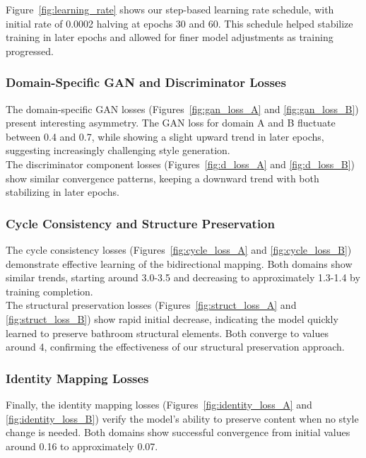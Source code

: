 \documentclass[twocolumn,superscriptaddress,aps]{revtex4-1}
\begin{document}
Figure~\ref{fig:learning_rate} shows our step-based learning rate schedule, with initial rate of 0.0002 halving at epochs 30 and 60. This schedule helped stabilize training in later epochs and allowed for finer model adjustments as training progressed.

\subsubsection{Domain-Specific GAN and Discriminator Losses}

The domain-specific GAN losses (Figures~\ref{fig:gan_loss_A} and \ref{fig:gan_loss_B}) present interesting asymmetry. The GAN loss for domain A and B fluctuate between 0.4 and 0.7, while showing a slight upward trend in later epochs, suggesting increasingly challenging style generation. \\

The discriminator component losses (Figures~\ref{fig:d_loss_A} and \ref{fig:d_loss_B}) show similar convergence patterns, keeping a downward trend with both stabilizing in later epochs.

\subsubsection{Cycle Consistency and Structure Preservation}

The cycle consistency losses (Figures~\ref{fig:cycle_loss_A} and \ref{fig:cycle_loss_B}) demonstrate effective learning of the bidirectional mapping. Both domains show similar trends, starting around 3.0-3.5 and decreasing to approximately 1.3-1.4 by training completion. \\

The structural preservation losses (Figures~\ref{fig:struct_loss_A} and \ref{fig:struct_loss_B}) show rapid initial decrease, indicating the model quickly learned to preserve bathroom structural elements. Both converge to values around 4, confirming the effectiveness of our structural preservation approach.

\subsubsection{Identity Mapping Losses}

Finally, the identity mapping losses (Figures~\ref{fig:identity_loss_A} and \ref{fig:identity_loss_B}) verify the model's ability to preserve content when no style change is needed. Both domains show successful convergence from initial values around 0.16 to approximately 0.07. 
\end{document}
